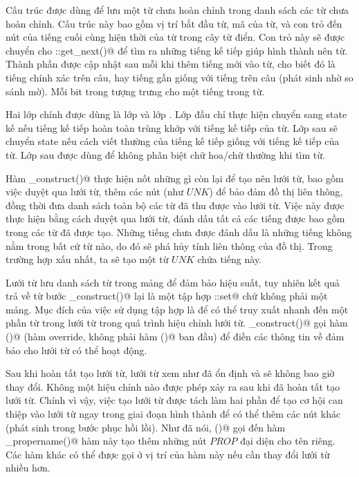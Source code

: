 \documentclass[a4paper,oneside,14pt]{extbook} %
\begin{document}
Cấu trúc \verb@WordState@ được dùng để lưu một từ chưa hoàn chỉnh
trong danh sách các từ chưa hoàn chỉnh. Cấu trúc này bao gồm vị trí
bắt đầu từ, mã \verb@fuzid@ của từ, và con trỏ đến nút của tiếng cuối cùng
hiện thời của từ trong cây từ điển. Con trỏ này sẽ được chuyển cho
\verb@WordNode::get_next()@ để tìm ra những tiếng kế tiếp giúp hình
thành nên từ. Thành phần \verb@fuzid@ được cập nhật sau mỗi khi thêm
tiếng mới vào từ, cho biết đó là tiếng chính xác trên câu, hay tiếng
gần giống với tiếng trên câu (phát sinh nhờ so sánh mờ). Mỗi bit trong
\verb@fuzid@ tượng trưng cho một tiếng trong từ.

Hai lớp chính được dùng là lớp \verb@ExactWordState@ và lớp
\verb@LowerWordState@. Lớp đầu chỉ thực hiện chuyển sang state kế nếu
tiếng kế tiếp hoàn toàn trùng khớp với tiếng kế tiếp của từ. Lớp sau
sẽ chuyển state nếu cách viết thường của tiếng kế tiếp giống với tiếng
kế tiếp của từ. Lớp sau được dùng để không phân biệt chữ hoa/chữ
thường khi tìm từ.

Hàm \verb@post_construct()@ thực hiện nốt những gì còn lại để tạo nên
lưới từ, bao gồm việc duyệt qua lưới từ, thêm các nút (như $UNK$)
để bảo đảm đồ thị liên thông, đồng thời đưa danh sách toàn bộ các từ
đã thu được vào lưới từ. Việc này được thực hiện bằng cách duyệt qua
lưới từ, đánh dấu tất cả các tiếng được bao gồm trong các từ đã được
tạo. Những tiếng chưa được đánh dấu là những tiếng không nằm trong bất
cứ từ nào, do đó sẽ phá hủy tính liên thông của đồ thị. Trong trường
hợp xấu nhất, ta sẽ tạo một từ $UNK$ chứa tiếng này.

Lưới từ lưu danh sách từ trong mảng để đảm bảo hiệu suất, tuy nhiên
kết quả trả về từ bước \verb@pre_construct()@ 
lại là một tập hợp \verb@std::set@ chứ không phải một mảng. Mục đích
của việc sử dụng tập hợp là để có thể truy xuất nhanh đến một phần từ
trong lưới từ trong quá trình hiệu chỉnh lưới
từ. \verb@post_construct()@ gọi hàm \verb@construct()@ (hàm override,
không phải hàm \verb@construct()@ ban đầu) để điền các thông tin về
\verb@WordInfos@ đảm bảo cho lưới từ có thể hoạt động.

Sau khi hoàn tất tạo lưới từ, lưới từ xem như đã ổn định và sẽ không
bao giờ thay đổi. Không một hiệu chỉnh nào được phép xảy ra sau khi đã
hoàn tất tạo lưới từ. Chính vì vậy, việc tạo lưới từ được tách làm hai
phần để tạo cơ hội can thiệp vào lưới từ ngay trong giai đoạn hình
thành để có thể thêm các nút khác (phát sinh trong bước phục hồi
lồi). Như đã nói, \verb@construct()@ gọi đến hàm
\verb@mark_propername()@ hàm này tạo thêm những nút $PROP$ đại diện
cho tên riêng. Các hàm khác có thể được gọi ở vị trí của hàm này nếu
cần thay đổi lưới từ nhiều hơn.
\end{document}
